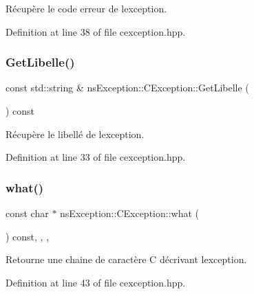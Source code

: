 Récupère le code erreur de l\textquotesingle{}exception. 



Definition at line 38 of file cexception.\+hpp.

\mbox{\label{classns_exception_1_1_c_exception_aef8e3d1a4e22ec7045d7d0b14d8b968a}} 
\subsubsection{\texorpdfstring{Get\+Libelle()}{GetLibelle()}}
{\footnotesize\ttfamily const std\+::string \& ns\+Exception\+::\+C\+Exception\+::\+Get\+Libelle (\begin{DoxyParamCaption}{ }\end{DoxyParamCaption}) const\hspace{0.3cm}{\ttfamily [inline]}}



Récupère le libellé de l\textquotesingle{}exception. 



Definition at line 33 of file cexception.\+hpp.

\mbox{\label{classns_exception_1_1_c_exception_a5ef0ababcc3ffc93f70211de1122c9a8}} 
\subsubsection{\texorpdfstring{what()}{what()}}
{\footnotesize\ttfamily const char $\ast$ ns\+Exception\+::\+C\+Exception\+::what (\begin{DoxyParamCaption}{ }\end{DoxyParamCaption}) const\hspace{0.3cm}{\ttfamily [inline]}, {\ttfamily [override]}, {\ttfamily [virtual]}, {\ttfamily [noexcept]}}



Retourne une chaine de caractère C décrivant l\textquotesingle{}exception. 



Definition at line 43 of file cexception.\+hpp.



